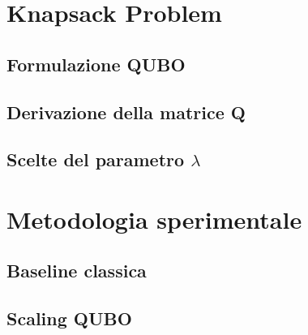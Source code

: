 \documentclass[12pt,a4paper,oneside]{report}
\begin{document}
\chapter{Knapsack Problem}
\label{ch:knapsack}

\section{Formulazione QUBO}
\label{sec:knapsack-qubo}

\section{Derivazione della matrice Q}
\label{sec:knapsack-matrice-q}

\section{Scelte del parametro $\lambda$}
\label{sec:knapsack-lambda}

\chapter{Metodologia sperimentale}
\label{ch:metodologia}

\section{Baseline classica}
\label{sec:baseline-classica}

\section{Scaling QUBO}
\label{sec:scaling-qubo}
\end{document}
